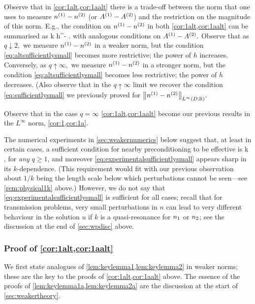 Observe that in \cref{cor:1alt,cor:1aalt} there is a trade-off between the norm that one uses to measure ${n}^{(1)}-{n}^{(2)}$ (or ${A}^{(1)}-{A}^{(2)}$) and the restriction on the magnitude of this norm. E.g., the condition on ${n}^{(1)}-{n}^{(2)}$ in both \cref{cor:1alt,cor:1aalt} can be summarised as
\beq\label{eq:altsufficientlysmall}
\NLqDRR{\nso-\nst} k h^{-} .
\eeq
with analogous conditions on ${A}^{(1)}-{A}^{(2)}.$ Observe that as $q \downarrow 2,$ we measure ${n}^{(1)}-{n}^{(2)}$ in a weaker norm, but the condition \cref{eq:altsufficientlysmall} becomes more restrictive; the power of $h$ increases. Conversely, as $q \uparrow \infty,$ we measure ${n}^{(1)}-{n}^{(2)}$ in a stronger norm, but the condition \cref{eq:altsufficientlysmall} becomes less restrictive; the power of $h$ decreases. (Also observe that in the $q\uparrow\infty$ limit we recover the condition \cref{eq:sufficientlysmall} we previously proved for $\NLiDRR{\nso-\nst}.$
\ere

Observe that in the case $q=\infty$ \cref{cor:1alt,cor:1aalt} become our previous results in the $L^\infty$ norm, \cref{cor:1,cor:1a}.
\ere

The numerical experiments in \cref{sec:weakernumerics} below suggest that, at least in certain cases, a sufficient condition for nearby preconditioning to be effective is
\beq\label{eq:experimentalsufficientlysmall}
\NLqDRR{\no-\nt} k \quad{},
\eeq
for \emph{any} $q \geq 1$, and moreover \cref{eq:experimentalsufficientlysmall} appears sharp in its $k$-dependence. (This requirement would fit with our previous observation about $1/k$ being the length scale below which perturbations cannot be seen---see \cref{rem:physical1k} above.) However, we do not say that \cref{eq:experimentalsufficientlysmall} is sufficient for all cases; recall that for transmission problems, very small perturbations in $n$ can lead to very different behaviour in the solution $u$ if $k$ is a quasi-resonance for $n_{1}$ or $n_{2}$; see the discussion at the end of \cref{sec:wpdisc} above.


\subsubsection{Proof of \cref{cor:1alt,cor:1aalt}}

We first state analogues of \cref{lem:keylemma1,lem:keylemma2} in weaker norms; these  are the key to the proofs of \cref{cor:1alt,cor:1aalt} above. The essence of the proofs of \cref{lem:keylemma1a,lem:keylemma2a} are the discussion at the start of \cref{sec:weakertheory}.

